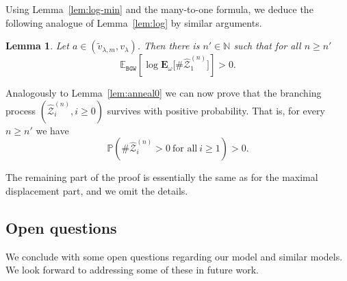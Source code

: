 \documentclass[11 pt]{article}
\newtheorem{lemma}[theorem]{Lemma}
\theoremstyle{definition}
\numberwithin{equation}{section}
\newcommand{\NN}{\mathbb{N}}
\newcommand{\EE}{\mathbb{E}} %
\newcommand{\PP}{\mathbb{P}} %
\newcommand{\Ew}{\mathbf{E}_{\omega}} %
\begin{document}
Using Lemma~\ref{lem:log-min} and the many-to-one formula, we deduce 
the following analogue of Lemma~\ref{lem:log}  by similar arguments. 
\begin{lemma}\label{lem:max-log}
	Let  $a\in (\widetilde{v}_{\lambda, m}, v_{\lambda})$. Then there is $n'\in \NN$ such that for all $n\geq n'$
	\begin{equation*}
		\EE_{\mathtt{BGW}} \left[\log \Ew\big[\# \widehat{\mathcal{Z}}^{(n)}_1 \big] \right] >0. 
	\end{equation*}
\end{lemma}

Analogously to Lemma~\ref{lem:anneal0} we can now prove that the branching process $(\widehat{\mathcal{Z}}^{(n)}_{i}, i\ge 0)$ survives with positive probability. That is, for every $n\geq n'$ we have
\begin{equation*}
	\PP(\#\widehat{\mathcal{Z}}^{(n)}_{i}>0 ~\text{for all}~ i\ge 1)> 0.  
\end{equation*}

The remaining part of the proof is essentially the same as for the maximal displacement part, and we omit the details.

\subsection{Open questions}\label{Open}

We conclude with  some open questions regarding our model and similar models. We look forward to addressing some of these in future work.
\end{document}
